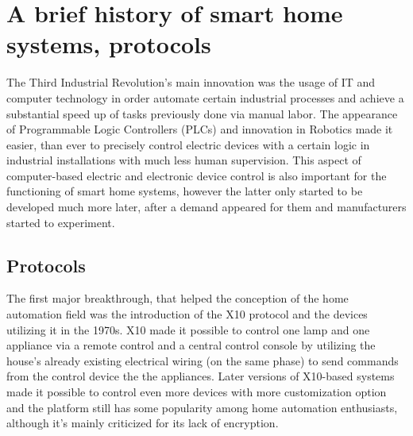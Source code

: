 \section{A brief history of smart home systems, protocols}

The Third Industrial Revolution's main innovation was the usage of IT and computer technology in order automate certain industrial processes and achieve a substantial speed up of tasks previously done via manual labor. \cite{UpkeepIndRev}
The appearance of Programmable Logic Controllers (PLCs) and innovation in Robotics made it easier, than ever to precisely control electric devices with a certain logic in industrial installations with much less human supervision. This aspect of computer-based electric and electronic device control is also important for the functioning of smart home systems, however the latter only started to be developed much more later, after a demand appeared for them and manufacturers started to experiment. %

\subsection{Protocols}

The first major breakthrough, that helped the conception of the home automation field was the introduction of the X10 protocol and the devices utilizing it in the 1970s. X10 made it possible to control one lamp and one appliance via a remote control and a central control console by utilizing the house's already existing electrical wiring (on the same phase) to send commands from the control device the the appliances. Later versions of X10-based systems made it possible to control even more devices with more customization option and the platform still has some popularity among home automation enthusiasts, although it's mainly criticized for its lack of encryption. \cite{CavaX10}\break

